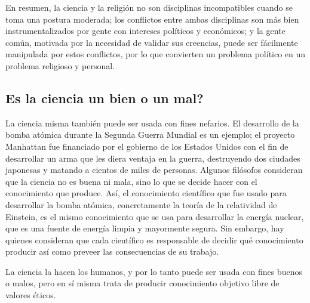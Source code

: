 En resumen, la ciencia y la religión no son disciplinas incompatibles cuando se
toma una postura moderada; los conflictos entre ambas disciplinas son más bien
instrumentalizados por gente con intereses políticos y económicos; y la gente
común, motivada por la necesidad de validar sus creencias, puede ser fácilmente
manipulada por estos conflictos, por lo que convierten un problema político en
un problema religioso y personal.

\subsection*{Es la ciencia un bien o un mal?}
\label{sub:eslacienciaunbienounmal}

La ciencia misma también puede ser usada con fines nefarios.
El desarrollo de la bomba atómica durante la Segunda Guerra Mundial es un
ejemplo; el proyecto Manhattan fue financiado por el gobierno de los Estados
Unidos con el fin de desarrollar un arma que les diera ventaja en la guerra,
destruyendo dos ciudades japonesas y matando a cientos de miles de personas.
Algunos filósofos consideran que la ciencia no es buena ni mala, sino lo que
se decide hacer con el conocimiento que produce.
Así, el conocimiento científico que fue usado para desarrollar la bomba atómica,
concretamente la teoría de la relatividad de Einstein, es el mismo conocimiento
que se usa para desarrollar la energía nuclear, que es una fuente de energía
limpia y mayormente segura.
Sin embargo, hay quienes consideran que cada científico es responsable de
decidir qué conocimiento producir así como preveer las consecuencias de su
trabajo.

\begin{remember}
    \label{rem:cienciabienomal}
    La ciencia la hacen los humanos, y por lo tanto puede ser usada con fines
    buenos o malos, pero en sí misma trata de producir conocimiento objetivo
    libre de valores éticos.
\end{remember}

